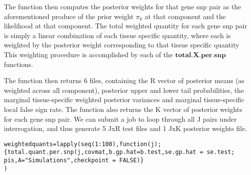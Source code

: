 \documentclass[10pt]{article}
\begin{document}
The function then computes the posterior weights for that gene snp pair as the aforementioned produce of the prior weight $\pi_{k}$ at that component and the likelihood at that component. The total weighted quantity for each gene snp pair is simply a linear combination of each tissue specific quantity, where each is weighted by the posterior weight corresponding to that tissue specific quantity This weighting procedure is accomplished by each of the $\textbf{total.X.per.snp}$ functions.

The function then returns  6 files, containing the R vector of posterior means (as weighted across all component), posterior upper and lower tail probabilities, the marginal tissue-specific weighted posterior variances and marginal tissue-specific local false sign rate. The function also returns the K vector of posterior weights for each gene snp pair. We can submit a job to loop through all J pairs under interrogation, and thus generate 5 JxR test files and 1 JxK posterior weights file.

\begin{verbatim}
weightedquants=lapply(seq(1:100),function(j);
{total.quant.per.snp(j,covmat,b.gp.hat=b.test,se.gp.hat = se.test;
pis,A="Simulations",checkpoint = FALSE)}
)
\end{verbatim}

                          
%  




\end{document}
